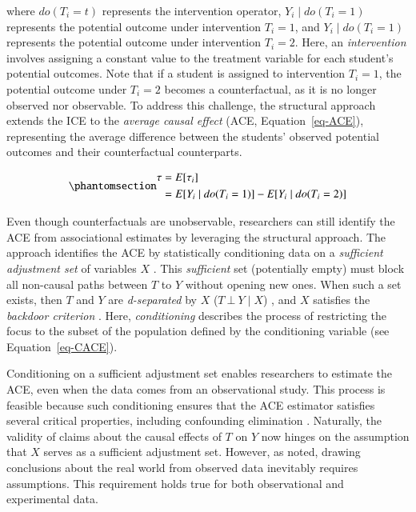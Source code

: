 \documentclass[
  authoryear,
  review,
  1p]{elsarticle}
\begin{document}
where \(do(T_{i}=t)\) represents the intervention operator,
\(Y_{i} \mid do(T_{i}=1)\) represents the potential outcome under
intervention \(T_{i}=1\), and \(Y_{i} \mid do(T_{i}=1)\) represents the
potential outcome under intervention \(T_{i}=2\). Here, an
\emph{intervention} involves assigning a constant value to the treatment
variable for each student's potential outcomes. Note that if a student
is assigned to intervention \(T_{i}=1\), the potential outcome under
\(T_{i}=2\) becomes a counterfactual, as it is no longer observed nor
observable. To address this challenge, the structural approach extends
the ICE to the \emph{average causal effect} (ACE,
Equation~\ref{eq-ACE}), representing the average difference between the
students' observed potential outcomes and their counterfactual
counterparts.

\begin{equation}\protect\phantomsection\label{eq-ACE}{
\begin{aligned}
\tau & = E[\tau_{i}] \\
  & = E[Y_{i} \mid do(T_{i}=1)]- E[Y_{i} \mid do(T_{i}=2)]
\end{aligned}
}\end{equation}

Even though counterfactuals are unobservable, researchers can still
identify the ACE from associational estimates by leveraging the
structural approach. The approach identifies the ACE by statistically
conditioning data on a \emph{sufficient adjustment set} of variables
\(X\) \citep{Pearl_2009, Pearl_et_al_2016, Morgan_et_al_2014}. This
\emph{sufficient} set (potentially empty) must block all non-causal
paths between \(T\) to \(Y\) without opening new ones. When such a set
exists, then \(T\) and \(Y\) are \emph{d-separated} by \(X\)
(\(T \:\bot\:Y \mid X\)) \citep{Pearl_2009}, and \(X\) satisfies the
\emph{backdoor criterion} \citep[pp 37]{Neal_2020}. Here,
\emph{conditioning} describes the process of restricting the focus to
the subset of the population defined by the conditioning variable
\citep[p.~32]{Neal_2020} (see Equation~\ref{eq-CACE}).

Conditioning on a sufficient adjustment set enables researchers to
estimate the ACE, even when the data comes from an observational study.
This process is feasible because such conditioning ensures that the ACE
estimator satisfies several critical properties, including confounding
elimination \citep{Morgan_et_al_2014}. Naturally, the validity of claims
about the causal effects of \(T\) on \(Y\) now hinges on the assumption
that \(X\) serves as a sufficient adjustment set. However, as
\citet[p.~150]{Kohler_et_al_2019} noted, drawing conclusions about the
real world from observed data inevitably requires assumptions. This
requirement holds true for both observational and experimental data.
\end{document}
